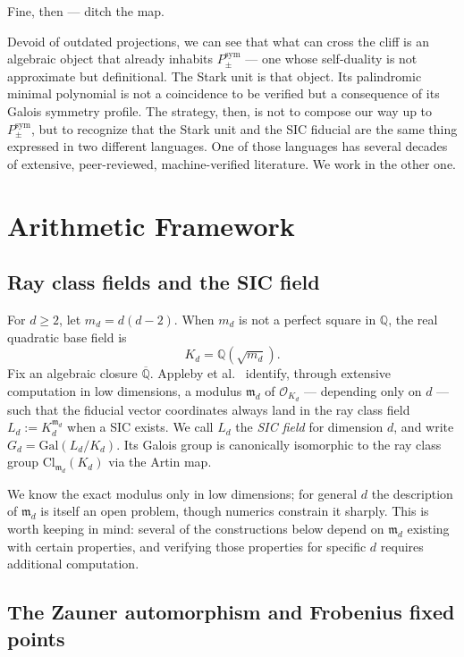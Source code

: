 \documentclass[12pt]{article}
\theoremstyle{plain}
\theoremstyle{definition}
\theoremstyle{remark}
\newcommand{\Gal}{\mathrm{Gal}}
\newcommand{\OO}{\mathcal{O}}
\newcommand{\bQ}{\mathbb{Q}}
\begin{document}
Fine, then — ditch the map.

Devoid of outdated projections, we can see that what can cross the cliff is an algebraic object that already inhabits $P_\pm^{\mathrm{sym}}$ — one whose self-duality is not approximate but definitional. The Stark unit is that object. Its palindromic minimal polynomial is not a coincidence to be verified but a consequence of its Galois symmetry profile. The strategy, then, is not to compose our way up to $P_\pm^{\mathrm{sym}}$, but to recognize that the Stark unit and the SIC fiducial are the same thing expressed in two different languages. One of those languages has several decades of extensive, peer-reviewed, machine-verified literature. We work in the other one.

\section{Arithmetic Framework}
\label{sec:arithmetic}

\subsection{Ray class fields and the SIC field}

For $d \geq 2$, let $m_d = d(d-2)$. When $m_d$ is not a perfect square in $\bQ$, the real quadratic base field is
\[
  K_d = \bQ(\sqrt{m_d}).
\]
Fix an algebraic closure $\overline{\bQ}$. Appleby et al.\ \cite{afmy2017} identify, through extensive computation in low dimensions, a modulus $\mathfrak{m}_d$ of $\OO_{K_d}$ — depending only on $d$ — such that the fiducial vector coordinates always land in the ray class field $L_d := K_d^{\mathfrak{m}_d}$ when a SIC exists. We call $L_d$ the \emph{SIC field} for dimension $d$, and write $G_d = \Gal(L_d / K_d)$. Its Galois group is canonically isomorphic to the ray class group $\mathrm{Cl}_{\mathfrak{m}_d}(K_d)$ via the Artin map.

We know the exact modulus only in low dimensions; for general $d$ the description of $\mathfrak{m}_d$ is itself an open problem, though numerics constrain it sharply. This is worth keeping in mind: several of the constructions below depend on $\mathfrak{m}_d$ existing with certain properties, and verifying those properties for specific $d$ requires additional computation.

\subsection{The Zauner automorphism and Frobenius fixed points}
\end{document}
